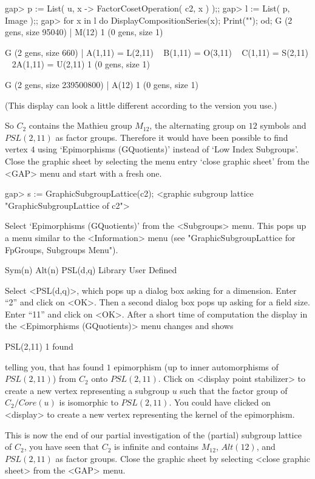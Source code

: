 \begintt
gap> p := List( u, x -> FactorCosetOperation( c2, x ) );;
gap> l := List( p, Image );;
gap> for x  in l  do DisplayCompositionSeries(x);  Print("\n");  od;
G (2 gens, size 95040)
 | M(12)
1 (0 gens, size 1)

G (2 gens, size 660)
 | A(1,11) = L(2,11) ~ B(1,11) = O(3,11) ~ C(1,11) = S(2,11) ~ 2A(1,11) = U(2,11)
1 (0 gens, size 1)

G (2 gens, size 239500800)
 | A(12)
1 (0 gens, size 1)
\endtt

(This display can look a little different according to  the {\GAP} version you
use.)

So $C_2$ contains the Mathieu group $M_{12}$, the alternating group on
$12$  symbols and $PSL(2,11)$   as factor groups.   Therefore it would
have   been   possible  to   find   vertex  $4$   using  
`Epimorphisms (GQuotients)'  instead of  `Low Index Subgroups'.   
Close the graphic
sheet by selecting the menu entry `close graphic sheet' from the <GAP>
menu and start with a fresh one.

\begintt
gap> s := GraphicSubgroupLattice(c2);
<graphic subgroup lattice "GraphicSubgroupLattice of c2">
\endtt

Select  `Epimorphisms (GQuotients)' from  the  <Subgroups> menu.  This
pops  up   a   menu   similar  to    the  <Information>   menu    (see
"GraphicSubgroupLattice for FpGroups, Subgroups Menu").

\begintt
Sym(n)
Alt(n)
PSL(d,q)
Library
User Defined 
\endtt

Select <PSL(d,q)>, which pops up a dialog  box asking for a dimension. 
Enter ``2'' and click on <OK>. Then a second dialog box pops up asking
for a field size.  Enter ``11'' and click on  <OK>. After a short time
of  computation the display  in  the <Epimorphisms (GQuotients)>  menu
changes and shows

\begintt
PSL(2,11)      1 found
\endtt

telling you, that {\GAP} has found $1$ epimorphism (up to inner
automorphisms of $PSL(2,11)$) from $C_2$ onto $PSL(2,11)$.  Click on
<display point stabilizer> to create a new vertex representing a subgroup
$u$ such that the factor group of $C_2 / Core(u)$ is isomorphic to
$PSL(2,11)$. You could have clicked on <display> to create a new vertex
representing the kernel of the epimorphism.

This is  now the  end of  our  partial investigation of  the (partial)
subgroup lattice of  $C_2$, you have  seen that $C_2$ is infinite  and
contains $M_{12}$, $Alt(12)$, and $PSL(2,11)$ as factor groups.  Close
the  graphic sheet by selecting <close  graphic sheet>  from the <GAP>
menu.


